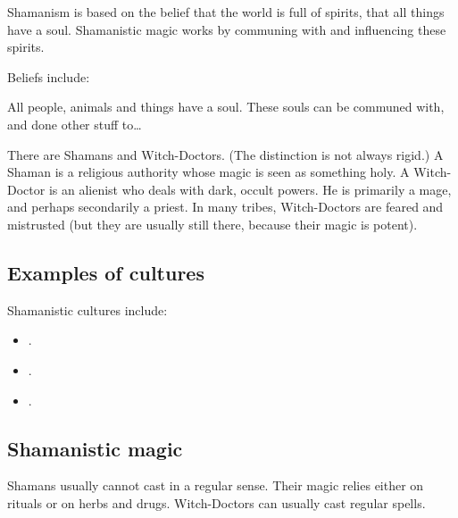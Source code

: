 Shamanism is based on the belief that the world is full of spirits, that all things have a soul. Shamanistic magic works by communing with and influencing these spirits. 

Beliefs include: 

All people, animals and things have a soul. These souls can be communed with, and done other stuff to\ldots{} 



There are Shamans and Witch-Doctors. (The distinction is not always rigid.) A Shaman is a religious authority whose magic is seen as something holy. A Witch-Doctor is an alienist who deals with dark, occult powers. He is primarily a mage, and perhaps secondarily a priest. In many tribes, Witch-Doctors are feared and mistrusted (but they are usually still there, because their magic is potent). 









\subsection{Examples of cultures}
Shamanistic cultures include: 

\begin{itemize}
  \item {}. 
  \item {}. 
  \item {}. 
\end{itemize}









\subsection{Shamanistic magic}
Shamans usually cannot cast  in a regular sense. Their magic relies either on rituals or on herbs and drugs. Witch-Doctors can usually cast regular spells. 

